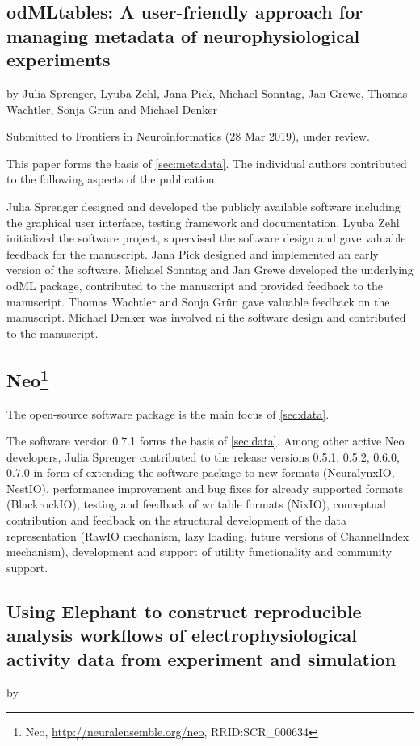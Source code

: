 \subsection*{odMLtables: A user-friendly approach for managing metadata of neurophysiological experiments}
by Julia Sprenger, Lyuba Zehl, Jana Pick, Michael Sonntag, Jan Grewe, Thomas Wachtler, Sonja Grün and Michael Denker

Submitted to Frontiers in Neuroinformatics (28 Mar 2019), under review.

This paper forms the basis of \cref{sec:metadata}. The individual authors contributed to the following aspects of the publication:

Julia Sprenger designed and developed the publicly available software including the graphical user interface, testing framework and documentation. Lyuba Zehl initialized the software project, supervised the software design and gave valuable feedback for the manuscript. Jana Pick designed and implemented an early version of the software. Michael Sonntag and Jan Grewe developed the underlying odML package, contributed to the manuscript and provided feedback to the manuscript. Thomas Wachtler and Sonja Grün gave valuable feedback on the manuscript. Michael Denker was involved ni the software design and contributed to the manuscript.

\subsection*{Neo\footnote{Neo, \url{http://neuralensemble.org/neo}, RRID:SCR\_000634}}
The open-source software package \citep{Garcia_2014} is the main focus of \cref{sec:data}. 

The software version 0.7.1 forms the basis of \cref{sec:data}. Among other active Neo developers, Julia Sprenger contributed to the release versions 0.5.1, 0.5.2, 0.6.0, 0.7.0 in form of extending the software package to new formats (NeuralynxIO, NestIO), performance improvement and bug fixes for already supported formats (BlackrockIO), testing and feedback of writable formats (NixIO), conceptual contribution and feedback on the structural development of the data representation (RawIO mechanism, lazy loading, future versions of ChannelIndex mechanism), development and support of utility functionality and community support.

\subsection*{Using Elephant to construct reproducible analysis workflows of electrophysiological activity data from experiment and simulation}
by 

